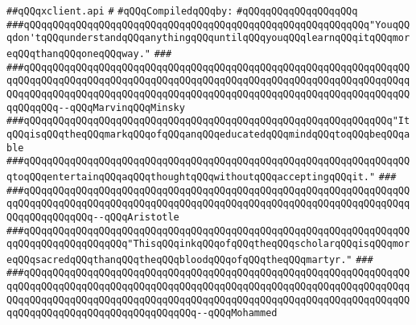 \label{src/lib/x-kit/xclient/xclient.api}
\verb|##qQQqxclient.api|\newline
\verb|#|\newline
\newline
\verb|#qQQqCompiledqQQqby:|\newline
\verb|#qQQqqQQqqQQqqQQqqQQq|\newline
\newline
\verb|###qQQqqQQqqQQqqQQqqQQqqQQqqQQqqQQqqQQqqQQqqQQqqQQqqQQqqQQqqQQq"YouqQQqdon'tqQQqunderstandqQQqanythingqQQquntilqQQqyouqQQqlearnqQQqitqQQqmoreqQQqthanqQQqoneqQQqway."|\newline
\verb|###|\newline
\verb|###qQQqqQQqqQQqqQQqqQQqqQQqqQQqqQQqqQQqqQQqqQQqqQQqqQQqqQQqqQQqqQQqqQQqqQQqqQQqqQQqqQQqqQQqqQQqqQQqqQQqqQQqqQQqqQQqqQQqqQQqqQQqqQQqqQQqqQQqqQQqqQQqqQQqqQQqqQQqqQQqqQQqqQQqqQQqqQQqqQQqqQQqqQQqqQQqqQQqqQQqqQQqqQQqqQQqqQQq--qQQqMarvinqQQqMinsky|\newline
\newline
\newline
\newline
\verb|###qQQqqQQqqQQqqQQqqQQqqQQqqQQqqQQqqQQqqQQqqQQqqQQqqQQqqQQqqQQqqQQq"ItqQQqisqQQqtheqQQqmarkqQQqofqQQqanqQQqeducatedqQQqmindqQQqtoqQQqbeqQQqable|\newline
\verb|###qQQqqQQqqQQqqQQqqQQqqQQqqQQqqQQqqQQqqQQqqQQqqQQqqQQqqQQqqQQqqQQqqQQqtoqQQqentertainqQQqaqQQqthoughtqQQqwithoutqQQqacceptingqQQqit."|\newline
\verb|###|\newline
\verb|###qQQqqQQqqQQqqQQqqQQqqQQqqQQqqQQqqQQqqQQqqQQqqQQqqQQqqQQqqQQqqQQqqQQqqQQqqQQqqQQqqQQqqQQqqQQqqQQqqQQqqQQqqQQqqQQqqQQqqQQqqQQqqQQqqQQqqQQqqQQqqQQqqQQqqQQq--qQQqAristotle|\newline
\newline
\newline
\newline
\verb|###qQQqqQQqqQQqqQQqqQQqqQQqqQQqqQQqqQQqqQQqqQQqqQQqqQQqqQQqqQQqqQQqqQQqqQQqqQQqqQQqqQQqqQQq"ThisqQQqinkqQQqofqQQqtheqQQqscholarqQQqisqQQqmoreqQQqsacredqQQqthanqQQqtheqQQqbloodqQQqofqQQqtheqQQqmartyr."|\newline
\verb|###|\newline
\verb|###qQQqqQQqqQQqqQQqqQQqqQQqqQQqqQQqqQQqqQQqqQQqqQQqqQQqqQQqqQQqqQQqqQQqqQQqqQQqqQQqqQQqqQQqqQQqqQQqqQQqqQQqqQQqqQQqqQQqqQQqqQQqqQQqqQQqqQQqqQQqqQQqqQQqqQQqqQQqqQQqqQQqqQQqqQQqqQQqqQQqqQQqqQQqqQQqqQQqqQQqqQQqqQQqqQQqqQQqqQQqqQQqqQQqqQQqqQQqqQQq--qQQqMohammed|\newline
